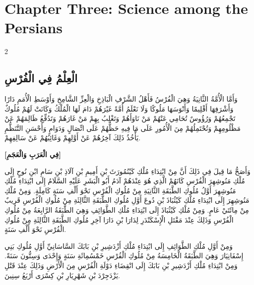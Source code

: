 \documentclass[11pt,a4paper]{article}
\newcommand{\ar}[1]{{\arabicfont\beginR #1\endR}}
\begin{document}
\section*{Chapter Three: Science among the Persians}

\begin{paracol}{2}
\sloppy

\begin{leftcolumn}
\subsection*{\ar{الْعِلْمُ فِي الْفُرْسِ}}
\vspace{0.3cm}
{\arabicfont\beginR
وَأَمَّا الْأُمَّةُ الثَّانِيَةُ وَهِيَ الْفُرْسُ فَأَهْلُ الشَّرْفِ الْبَاذِخِ وَالْعِزِّ الشَّامِخِ وَأَوْسَطِ الْأُمَمِ دَارًا وَأَشْرَفِهَا أَقْلِيمًا وَأَنْوَسَهَا مَلُوكًا وَلَا نَعْلَمُ أُمَّةً غَيْرَهُمْ دَامَ لَهَا الْمُلْكُ وَكَانَتْ لَهُمْ مُلُوكٌ تَجْمِعُهُمْ وَرُؤُوسٌ تُحَامِي عَنْهُمْ مَنْ نَاوَأَهُمْ وَتَغْلِبُ بِهِمْ مَنْ غَارَهُمْ وَتَدُفِّعُ ظَالِمَهُمْ عَنْ مَظْلُومِهِمْ وَتُحْتَمِلُهُمْ مِنَ الْأُمُورِ عَلَى مَا فِيهِ حَظُّهُمْ عَلَى اتِّصَالٍ وَدَوَامٍ وَأَحْسَنِ التَّنَظُّمِ يَأْخُذُ ذَلِكَ آخِرُهُمْ عَنْ أَوَّلِهِمْ وَغَائِبُهُمْ عَنْ سَالِفِهِمْ.
\endR}

\vspace{0.4cm}
{\arabicfont\beginR
\textbf{[فِي الْعَرَبِ وَالْعَجَمِ]}
\endR}

\vspace{0.3cm}
{\arabicfont\beginR
وَأَصَحُّ مَا قِيلَ فِي ذَلِكَ أَنَّ مِنْ ابْتِدَاءِ مُلْكِ كَيْنُمُورَثَ بْنِ أَمِيمِ بْنِ آلَاذِ بْنِ سَامِ ابْنِ نُوحٍ إِلَى مُلْكِ مَنُوشِهِرَ الْفُرْسِ كَانَهُمْ الَّذِي هُوَ عِنْدَهُمْ آدَمُ أَبُو الْبَشَرِ عَلَيْهِ السَّلَامُ إِلَى ابْتِدَاءِ مُلْكِ مَنُوشِهِرَ أَوَّلُ مُلُوكِ الطَّبَقَةِ الثَّانِيَةِ مِنْ مُلُوكِ الْفُرْسِ نَحْوَ أَلْفِ سَنَةٍ كَامِلَةٍ. وَمِنْ مُلْكِ مَنُوشِهِرَ إِلَى ابْتِدَاءِ مُلْكِ كَيْثُبَاذَ بْنِ دُوعَ أَوَّلِ مُلُوكِ الطَّبَقَةِ الثَّالِثَةِ مِنْ مُلُوكِ الْفُرْسِ قَرِيبٌ مِنْ مِائَتَيْ عَامٍ. وَمِنْ مُلْكِ كَيْثُبَاذَ إِلَى ابْتِدَاءِ مُلْكِ الطَّوَائِفِ وَهِيَ الطَّبَقَةُ الرَّابِعَةُ مِنْ مُلُوكِ الْفُرْسِ وَذَلِكَ عِنْدَ مَقْتَلِ الْإِسْكَنْدَرِ لِدَارَا بْنِ دَارَا آخِرِ مُلُوكِ الطَّبَقَةِ الثَّالِثَةِ مِنْ مُلُوكِ الْفُرْسِ نَحْوَ أَلْفِ سَنَةٍ.
\endR}

\vspace{0.3cm}
{\arabicfont\beginR
وَمِنْ أَوَّلِ مُلْكِ الطَّوَائِفِ إِلَى ابْتِدَاءِ مُلْكِ أَزْدَشِيرِ بْنِ بَابَكَ السَّاسَانِيِّ أَوَّلِ مُلُوكِ بَنِي إِسْفَانِيَارَ وَهِيَ الطَّبَقَةُ الْخَامِسَةُ مِنْ مُلُوكِ الْفُرْسِ خَمْسُمِائَةِ سَنَةٍ وَإِحْدَى وَسِتُّونَ سَنَةً. وَمِنْ ابْتِدَاءِ مُلْكِ أَزْدَشِيرِ بْنِ بَابَكَ إِلَى انْقِضَاءِ دَوْلَةِ الْفُرْسِ مِنَ الْأَرْضِ وَذَلِكَ عِنْدَ قَتْلِ يَزْدَجِرْدَ بْنِ شَهْرِيَارِ بْنِ كِسْرَى أَرْبَعُ سِنِينَ.
\endR}
\end{leftcolumn}


\end{paracol}
\end{document}
